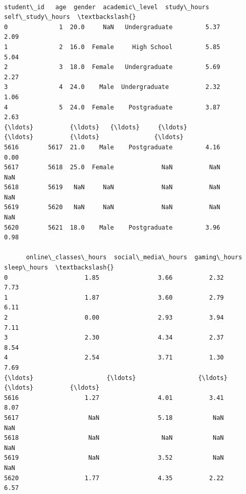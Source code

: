 \documentclass[11pt]{article}
\makeatletter
\newcommand{\boxspacing}{\kern\kvtcb@left@rule\kern\kvtcb@boxsep}
\newcommand{\prompt}[4]{
        {\ttfamily\llap{{\color{#2}[#3]:\hspace{3pt}#4}}\vspace{-\baselineskip}}
    }
\makeatother
\begin{document}
    \begin{center}
    \end{center}
    { \hspace*{\fill} \\}
    
            \begin{tcolorbox}[breakable, size=fbox, boxrule=.5pt, pad at break*=1mm, opacityfill=0]
\prompt{Out}{outcolor}{43}{\boxspacing}
\begin{Verbatim}[commandchars=\\\{\}]
      student\_id   age  gender  academic\_level  study\_hours  self\_study\_hours  \textbackslash{}
0              1  20.0     NaN   Undergraduate         5.37              2.09
1              2  16.0  Female     High School         5.85              5.04
2              3  18.0  Female   Undergraduate         5.69              2.27
3              4  24.0    Male  Undergraduate          2.32              1.06
4              5  24.0  Female    Postgraduate         3.87              2.63
{\ldots}          {\ldots}   {\ldots}     {\ldots}             {\ldots}          {\ldots}               {\ldots}
5616        5617  21.0    Male    Postgraduate         4.16              0.00
5617        5618  25.0  Female             NaN          NaN               NaN
5618        5619   NaN     NaN             NaN          NaN               NaN
5619        5620   NaN     NaN             NaN          NaN               NaN
5620        5621  18.0    Male    Postgraduate         3.96              0.98

      online\_classes\_hours  social\_media\_hours  gaming\_hours  sleep\_hours  \textbackslash{}
0                     1.85                3.66          2.32         7.73
1                     1.87                3.60          2.79         6.11
2                     0.00                2.93          3.94         7.11
3                     2.30                4.34          2.37         8.54
4                     2.54                3.71          1.30         7.69
{\ldots}                    {\ldots}                 {\ldots}           {\ldots}          {\ldots}
5616                  1.27                4.01          3.41         8.07
5617                   NaN                5.18           NaN          NaN
5618                   NaN                 NaN           NaN          NaN
5619                   NaN                3.52           NaN          NaN
5620                  1.77                4.35          2.22         6.57


\end{Verbatim}
\end{tcolorbox}
\end{document}
